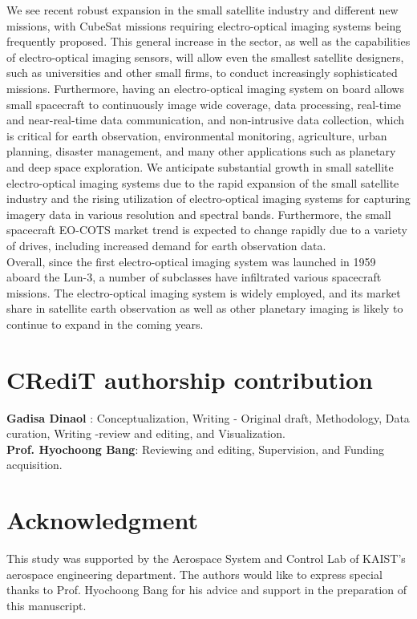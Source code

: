 \documentclass[final,5p,times,twocolumn]{elsarticle}
\begin{document}
We see recent robust expansion in the small satellite industry and different new missions, with CubeSat missions requiring electro-optical imaging systems being frequently proposed. This general increase in the sector, as well as the capabilities of electro-optical imaging sensors, will allow even the smallest satellite designers, such as universities and other small firms, to conduct increasingly sophisticated missions. Furthermore, having an electro-optical imaging system on board allows small spacecraft to continuously image wide coverage, data processing, real-time and near-real-time data communication, and non-intrusive data collection, which is critical for earth observation, environmental monitoring, agriculture, urban planning, disaster management, and many other applications such as planetary and deep space exploration.  We anticipate substantial growth in small satellite electro-optical imaging systems due to the rapid expansion of the small satellite industry and the rising utilization of electro-optical imaging systems for capturing imagery data in various resolution and spectral bands. Furthermore, the small spacecraft EO-COTS market trend is expected to change rapidly due to a variety of drives, including increased demand for earth observation data.\\
Overall, since the first electro-optical imaging system was launched in 1959 aboard the Lun-3, a number of subclasses have infiltrated various spacecraft missions. The electro-optical imaging system is widely employed, and its market share in satellite earth observation as well as other planetary imaging is likely to continue to expand in the coming years.
\section*{CRediT authorship contribution }
\textbf{Gadisa Dinaol }: Conceptualization,  Writing - Original draft, Methodology, Data curation, Writing -review and editing, and Visualization.\\
\textbf{Prof. Hyochoong Bang}: Reviewing and editing,  Supervision, and Funding acquisition.
\section*{Acknowledgment}
This study was supported by the Aerospace System and Control Lab of KAIST's aerospace engineering department. The authors would like to express special thanks to Prof. Hyochoong Bang for his advice and support in the preparation of this manuscript.
\end{document}
